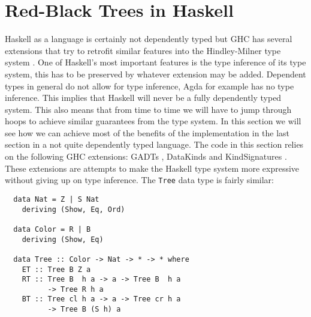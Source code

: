 \documentclass[journal, retainorgcmds]{IEEEtran}
\newcommand{\ihask}[1]{\texttt{#1}}
\begin{document}
\section{Red-Black Trees in Haskell}

Haskell as a language is certainly not dependently typed but GHC \cite{ghc} has
several extensions that try to retrofit similar features into the
Hindley-Milner type system \cite{hindley}.
One of Haskell's most important features is the type inference of its type
system, this has to be preserved by whatever extension may be added.
Dependent types in general do not allow for type inference, Agda for example
has no type inference.
This implies that Haskell will never be a fully dependently typed system.
This also means that from time to time we will have to jump through hoops to
achieve similar guarantees from the type system.
In this section we will see how we can achieve most of the benefits of the
implementation in the last section in a not quite dependently typed language.
The code in this section relies on the following GHC extensions: GADTs
\cite{gadts}, DataKinds \cite{datakinds} and KindSignatures
\cite{kindsigs}.
These extensions are attempts to make the Haskell type system more expressive
without giving up on type inference.
The \ihask{Tree} data type is fairly similar:

\begin{verbatim}
  data Nat = Z | S Nat
    deriving (Show, Eq, Ord)

  data Color = R | B
    deriving (Show, Eq)

  data Tree :: Color -> Nat -> * -> * where
    ET :: Tree B Z a
    RT :: Tree B  h a -> a -> Tree B  h a
          -> Tree R h a
    BT :: Tree cl h a -> a -> Tree cr h a
          -> Tree B (S h) a
\end{verbatim}
\end{document}
